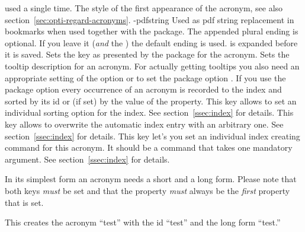 \documentclass{acro-manual}
\begin{document}
\begin{properties}
    used a single time.
    The style of the first appearance of the acronym, see
    also section~\ref{sec:opti-regard-acronyms}.
  \proplit-{pdfstring}{}
    Used as \acs{pdf} string replacement in bookmarks
    when used together with the  package.  The appended plural
    ending is optional.  If you leave it (\emph{and} the \code{/}) the default
    ending is used.   is expanded before it is saved.
    Sets the  key as presented by the  package
    for the acronym.
    Sets the tooltip description for an acronym.  For
    actually getting tooltips you also need an appropriate setting of the
     option or to set the package option
    .
    If you use the package option  every occurrence of an
    acronym is recorded to the index and sorted by its \acs{id} or (if set) by
    the value of the  property.  This key allows to set an
    individual sorting option for the index.  See section~\vref{ssec:index}
    for details.
    This key allows to overwrite the automatic index entry with an arbitrary
    one.  See section~\vref{ssec:index} for details.
    This key let's you set an individual index creating command for this
    acronym.  It should be a command that takes one mandatory argument.  See
    section~\vref{ssec:index} for details. 
\end{properties}

\begin{bewareofthedog}
  In its simplest form an acronym needs a short and a long form.  Please note
  that both keys \emph{must} be set and that the  property
  \emph{must} always be the \emph{first} property that is set.
\end{bewareofthedog}

\begin{sourcecode}
\end{sourcecode}
This creates the acronym ``\acs{test}'' with the \acs{id} ``test'' and the
long form ``\acl{test}.''
\end{document}
